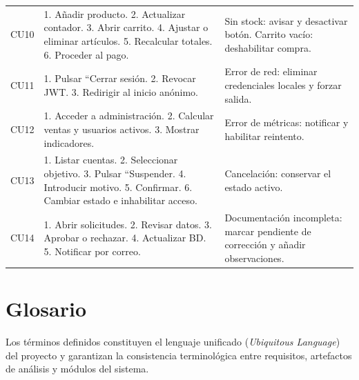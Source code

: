 \begin{longtable}{p{3cm}p{7.1cm}p{5.3cm}}
CU10&1. Añadir producto. 2. Actualizar contador. 3. Abrir carrito. 4. Ajustar o eliminar artículos. 5. Recalcular totales. 6. Proceder al pago.&Sin stock: avisar y desactivar botón. Carrito vacío: deshabilitar compra.\\
CU11&1. Pulsar ``Cerrar sesión. 2. Revocar JWT. 3. Redirigir al inicio anónimo.&Error de red: eliminar credenciales locales y forzar salida.\\
CU12&1. Acceder a administración. 2. Calcular ventas y usuarios activos. 3. Mostrar indicadores.&Error de métricas: notificar y habilitar reintento.\\
CU13&1. Listar cuentas. 2. Seleccionar objetivo. 3. Pulsar ``Suspender. 4. Introducir motivo. 5. Confirmar. 6. Cambiar estado e inhabilitar acceso.&Cancelación: conservar el estado activo.\\
CU14&1. Abrir solicitudes. 2. Revisar datos. 3. Aprobar o rechazar. 4. Actualizar BD. 5. Notificar por correo.&Documentación incompleta: marcar pendiente de corrección y añadir observaciones.\\
\hline
\end{longtable}

\section{Glosario}

Los términos definidos constituyen el lenguaje unificado (\emph{Ubiquitous Language}) del proyecto y garantizan la consistencia terminológica entre requisitos, artefactos de análisis y módulos del sistema.

